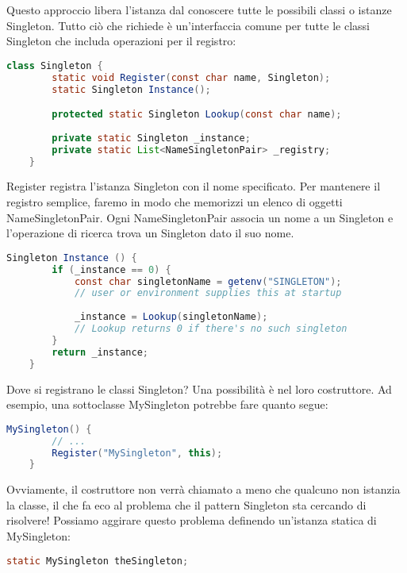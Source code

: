 Questo approccio libera l'istanza dal conoscere tutte le possibili classi o istanze Singleton. Tutto ciò che richiede è un'interfaccia comune per tutte le classi Singleton che includa operazioni per il registro:

\begin{lstlisting}[language=java]
    class Singleton {
        static void Register(const char name, Singleton);
        static Singleton Instance();

        protected static Singleton Lookup(const char name);
        
        private static Singleton _instance;
        private static List<NameSingletonPair> _registry;
    }
\end{lstlisting}

Register registra l'istanza Singleton con il nome specificato. Per mantenere il registro semplice, faremo in modo che memorizzi un elenco di oggetti NameSingletonPair. Ogni NameSingletonPair associa un nome a un Singleton e l'operazione di ricerca trova un Singleton dato il suo nome.

\begin{lstlisting}[language=java]
    Singleton Instance () {
        if (_instance == 0) {
            const char singletonName = getenv("SINGLETON");
            // user or environment supplies this at startup
            
            _instance = Lookup(singletonName);
            // Lookup returns 0 if there's no such singleton
        }
        return _instance;
    }
\end{lstlisting}

Dove si registrano le classi Singleton? Una possibilità è nel loro costruttore. Ad esempio, una sottoclasse MySingleton potrebbe fare quanto segue:

\begin{lstlisting}[language=java]
    MySingleton() {
        // ...
        Register("MySingleton", this);
    }
\end{lstlisting}

Ovviamente, il costruttore non verrà chiamato a meno che qualcuno non istanzia la classe, il che fa eco al problema che il pattern Singleton sta cercando di risolvere! Possiamo aggirare questo problema definendo un'istanza statica di MySingleton:

\begin{lstlisting}[language=java]
    static MySingleton theSingleton;
\end{lstlisting}

